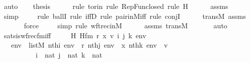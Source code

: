 \begin{isabellebody}
\ auto\isanewline
\isanewline
\ \ \isamarkupfalse%
\ {\isacharquery}{\kern0pt}thesis\ \isanewline
\ \ \ \ \isamarkupfalse%
{\isacharparenleft}{\kern0pt}rule\ to{\isacharunderscore}{\kern0pt}rin{\isacharcomma}{\kern0pt}\ rule\ RepFun{\isacharunderscore}{\kern0pt}closed{\isacharcomma}{\kern0pt}\ rule\ H{}{\isacharparenright}{\kern0pt}\isanewline
\ \ \ \ \isamarkupfalse%
\ assms\ \isanewline
\ \ \ \ \ \isamarkupfalse%
\ simp\isanewline
\ \ \ \ \isamarkupfalse%
{\isacharparenleft}{\kern0pt}rule\ ballI{\isacharcomma}{\kern0pt}\ rule\ iffD{}{\isacharcomma}{\kern0pt}\ rule\ pair{\isacharunderscore}{\kern0pt}in{\isacharunderscore}{\kern0pt}M{\isacharunderscore}{\kern0pt}iff{\isacharcomma}{\kern0pt}\ rule\ conjI{\isacharparenright}{\kern0pt}\isanewline
\ \ \ \ \isamarkupfalse%
\ transM\ assms\isanewline
\ \ \ \ \ \isamarkupfalse%
\ force\isanewline
\ \ \ \ \isamarkupfalse%
{\isacharparenleft}{\kern0pt}simp{\isacharcomma}{\kern0pt}\ rule\ wftrec{\isacharunderscore}{\kern0pt}in{\isacharunderscore}{\kern0pt}M{\isacharparenright}{\kern0pt}\isanewline
\ \ \ \ \isamarkupfalse%
\ assms\ transM\ \isanewline
\ \ \ \ \isamarkupfalse%
\ auto\isanewline
{}\isamarkupfalse%
%
\endisatagproof
{\isafoldproof}%
%
\isadelimproof
\isanewline
%
\endisadelimproof
\isanewline
{}\isamarkupfalse%
\ sats{\isacharunderscore}{\kern0pt}is{\isacharunderscore}{\kern0pt}wfrec{\isacharunderscore}{\kern0pt}fm{\isacharunderscore}{\kern0pt}iff\ {\isacharcolon}{\kern0pt}\ \isanewline
\ \ \ H\ Hfm\ r\ x\ v\ i\ j\ k\ env\ \isanewline
\ \ \ {\isachardoublequoteopen}env\ {\isasymin}\ list{\isacharparenleft}{\kern0pt}M{\isacharparenright}{\kern0pt}{\isachardoublequoteclose}\ {\isachardoublequoteopen}nth{\isacharparenleft}{\kern0pt}i{\isacharcomma}{\kern0pt}\ env{\isacharparenright}{\kern0pt}\ {\isacharequal}{\kern0pt}\ r{\isachardoublequoteclose}\ {\isachardoublequoteopen}nth{\isacharparenleft}{\kern0pt}j{\isacharcomma}{\kern0pt}\ env{\isacharparenright}{\kern0pt}\ {\isacharequal}{\kern0pt}\ x{\isachardoublequoteclose}\ {\isachardoublequoteopen}nth{\isacharparenleft}{\kern0pt}k{\isacharcomma}{\kern0pt}\ env{\isacharparenright}{\kern0pt}\ {\isacharequal}{\kern0pt}\ v{\isachardoublequoteclose}\ \ \isanewline
\ \ \ \ \ \ \ \ \ \ {\isachardoublequoteopen}i\ {\isasymin}\ nat{\isachardoublequoteclose}\ {\isachardoublequoteopen}j\ {\isasymin}\ nat{\isachardoublequoteclose}\ {\isachardoublequoteopen}k\ {\isasymin}\ nat{\isachardoublequoteclose}\ \isanewline

\end{isabellebody}
